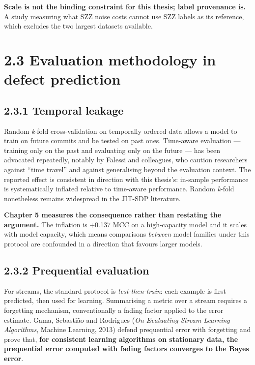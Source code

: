 \textbf{Scale is not the binding constraint for this thesis; label
provenance is.} A study measuring what SZZ noise costs cannot use SZZ
labels as its reference, which excludes the two largest datasets
available.

\section{2.3 Evaluation methodology in defect
prediction}\label{evaluation-methodology-in-defect-prediction}

\subsection{2.3.1 Temporal leakage}\label{temporal-leakage}

Random \emph{k}-fold cross-validation on temporally ordered data allows
a model to train on future commits and be tested on past ones.
Time-aware evaluation --- training only on the past and evaluating only
on the future --- has been advocated repeatedly, notably by Falessi and
colleagues, who caution researchers against ``time travel'' and against
generalising beyond the evaluation context. The reported effect is
consistent in direction with this thesis's: in-sample performance is
systematically inflated relative to time-aware performance. Random
\emph{k}-fold nonetheless remains widespread in the JIT-SDP literature.

\textbf{Chapter 5 measures the consequence rather than restating the
argument.} The inflation is +0.137 MCC on a high-capacity model and it
scales with model capacity, which means comparisons \emph{between} model
families under this protocol are confounded in a direction that favours
larger models.

\subsection{2.3.2 Prequential evaluation}\label{prequential-evaluation}

For streams, the standard protocol is \emph{test-then-train}: each
example is first predicted, then used for learning. Summarising a metric
over a stream requires a forgetting mechanism, conventionally a fading
factor applied to the error estimate. Gama, Sebasti\~{a}o and Rodrigues
(\emph{On Evaluating Stream Learning Algorithms}, Machine Learning,
2013) defend prequential error with forgetting and prove that,
\textbf{for consistent learning algorithms on stationary data, the
prequential error computed with fading factors converges to the Bayes
error}.

